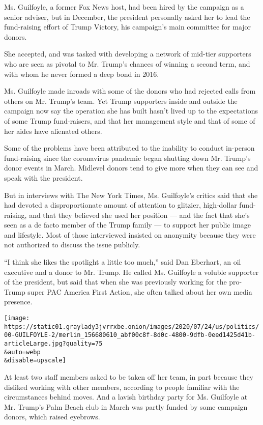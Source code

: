 Ms. Guilfoyle, a former Fox News host, had been hired by the campaign as
a senior adviser, but in December, the president personally asked her to
lead the fund-raising effort of Trump Victory, his campaign's main
committee for major donors.

She accepted, and was tasked with developing a network of mid-tier
supporters who are seen as pivotal to Mr. Trump's chances of winning a
second term, and with whom he never formed a deep bond in 2016.

Ms. Guilfoyle made inroads with some of the donors who had rejected
calls from others on Mr. Trump's team. Yet Trump supporters inside and
outside the campaign now say the operation she has built hasn't lived up
to the expectations of some Trump fund-raisers, and that her management
style and that of some of her aides have alienated others.

Some of the problems have been attributed to the inability to conduct
in-person fund-raising since the coronavirus pandemic began shutting
down Mr. Trump's donor events in March. Midlevel donors tend to give
more when they can see and speak with the president.

But in interviews with The New York Times, Ms. Guilfoyle's critics said
that she had devoted a disproportionate amount of attention to glitzier,
high-dollar fund-raising, and that they believed she used her position
--- and the fact that she's seen as a de facto member of the Trump
family --- to support her public image and lifestyle. Most of those
interviewed insisted on anonymity because they were not authorized to
discuss the issue publicly.

``I think she likes the spotlight a little too much,'' said Dan
Eberhart, an oil executive and a donor to Mr. Trump. He called Ms.
Guilfoyle a voluble supporter of the president, but said that when she
was previously working for the pro-Trump super PAC America First Action,
she often talked about her own media presence.

\texttt{[image: https://static01.graylady3jvrrxbe.onion/images/2020/07/24/us/politics/00-GUILFOYLE-2/merlin\_156680610\_abf00c8f-8d0c-4800-9dfb-0eed1425d41b-articleLarge.jpg?quality=75\\\&auto=webp\\\&disable=upscale]}

At least two staff members asked to be taken off her team, in part
because they disliked working with other members, according to people
familiar with the circumstances behind moves. And a lavish birthday
party for Ms. Guilfoyle at Mr. Trump's Palm Beach club in March was
partly funded by some campaign donors, which raised eyebrows.

